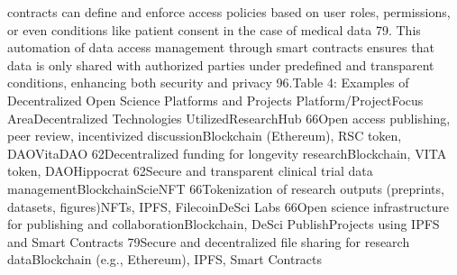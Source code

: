 \documentclass{article}
\begin{document}
contracts can define and enforce access policies based on user roles, permissions, or even conditions like patient consent in the case of medical data 79. This automation of data access management through smart contracts ensures that data is only shared with authorized parties under predefined and transparent conditions, enhancing both security and privacy 96.Table 4: Examples of Decentralized Open Science Platforms and Projects
Platform/ProjectFocus AreaDecentralized Technologies UtilizedResearchHub 66Open access publishing, peer review, incentivized discussionBlockchain (Ethereum), RSC token, DAOVitaDAO 62Decentralized funding for longevity researchBlockchain, VITA token, DAOHippocrat 62Secure and transparent clinical trial data managementBlockchainScieNFT 66Tokenization of research outputs (preprints, datasets, figures)NFTs, IPFS, FilecoinDeSci Labs 66Open science infrastructure for publishing and collaborationBlockchain, DeSci PublishProjects using IPFS and Smart Contracts 79Secure and decentralized file sharing for research dataBlockchain (e.g., Ethereum), IPFS, Smart Contracts
\end{document}
